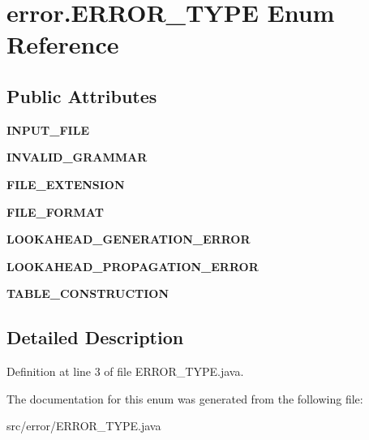\hypertarget{enumerror_1_1_e_r_r_o_r___t_y_p_e}{\section{error.\-E\-R\-R\-O\-R\-\_\-\-T\-Y\-P\-E Enum Reference}
\label{enumerror_1_1_e_r_r_o_r___t_y_p_e}
}
\subsection*{Public Attributes}
\begin{DoxyCompactItemize}
\item 
\hypertarget{enumerror_1_1_e_r_r_o_r___t_y_p_e_aaf121a60e23c7992ec551d81ebd96f1d}{{\bfseries I\-N\-P\-U\-T\-\_\-\-F\-I\-L\-E}}\label{enumerror_1_1_e_r_r_o_r___t_y_p_e_aaf121a60e23c7992ec551d81ebd96f1d}

\item 
\hypertarget{enumerror_1_1_e_r_r_o_r___t_y_p_e_ac6422d34d3c09d323665c858be149f21}{{\bfseries I\-N\-V\-A\-L\-I\-D\-\_\-\-G\-R\-A\-M\-M\-A\-R}}\label{enumerror_1_1_e_r_r_o_r___t_y_p_e_ac6422d34d3c09d323665c858be149f21}

\item 
\hypertarget{enumerror_1_1_e_r_r_o_r___t_y_p_e_a9fa75306960e1fb136a04aa2d4526cf3}{{\bfseries F\-I\-L\-E\-\_\-\-E\-X\-T\-E\-N\-S\-I\-O\-N}}\label{enumerror_1_1_e_r_r_o_r___t_y_p_e_a9fa75306960e1fb136a04aa2d4526cf3}

\item 
\hypertarget{enumerror_1_1_e_r_r_o_r___t_y_p_e_a344986e464ffe95c490b7b2278b72d4f}{{\bfseries F\-I\-L\-E\-\_\-\-F\-O\-R\-M\-A\-T}}\label{enumerror_1_1_e_r_r_o_r___t_y_p_e_a344986e464ffe95c490b7b2278b72d4f}

\item 
\hypertarget{enumerror_1_1_e_r_r_o_r___t_y_p_e_a34b2ee3da4f35c59f641f0eb1e60d06b}{{\bfseries L\-O\-O\-K\-A\-H\-E\-A\-D\-\_\-\-G\-E\-N\-E\-R\-A\-T\-I\-O\-N\-\_\-\-E\-R\-R\-O\-R}}\label{enumerror_1_1_e_r_r_o_r___t_y_p_e_a34b2ee3da4f35c59f641f0eb1e60d06b}

\item 
\hypertarget{enumerror_1_1_e_r_r_o_r___t_y_p_e_a583a3c72741f960e25fb8e45864e40cb}{{\bfseries L\-O\-O\-K\-A\-H\-E\-A\-D\-\_\-\-P\-R\-O\-P\-A\-G\-A\-T\-I\-O\-N\-\_\-\-E\-R\-R\-O\-R}}\label{enumerror_1_1_e_r_r_o_r___t_y_p_e_a583a3c72741f960e25fb8e45864e40cb}

\item 
\hypertarget{enumerror_1_1_e_r_r_o_r___t_y_p_e_ae438784bc1f218c01def311d198edaaa}{{\bfseries T\-A\-B\-L\-E\-\_\-\-C\-O\-N\-S\-T\-R\-U\-C\-T\-I\-O\-N}}\label{enumerror_1_1_e_r_r_o_r___t_y_p_e_ae438784bc1f218c01def311d198edaaa}

\end{DoxyCompactItemize}


\subsection{Detailed Description}


Definition at line 3 of file E\-R\-R\-O\-R\-\_\-\-T\-Y\-P\-E.\-java.



The documentation for this enum was generated from the following file\-:\begin{DoxyCompactItemize}
\item 
src/error/E\-R\-R\-O\-R\-\_\-\-T\-Y\-P\-E.\-java\end{DoxyCompactItemize}
